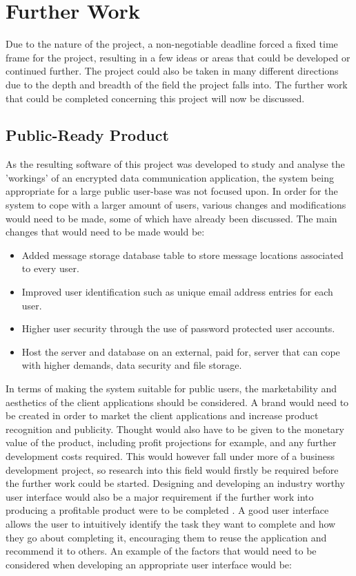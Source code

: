 \documentclass[a4paper,12pt]{report}
\begin{document}
\chapter{Further Work}

Due to the nature of the project, a non-negotiable deadline forced a fixed time frame for the project, resulting in a few ideas or areas that could be developed or continued further. The project could also be taken in many different directions due to the depth and breadth of the field the project falls into. The further work that could be completed concerning this project will now be discussed. 

\section{Public-Ready Product}

As the resulting software of this project was developed to study and analyse the 'workings' of an encrypted data communication application, the system being appropriate for a large public user-base was not focused upon. In order for the system to cope with a larger amount of users, various changes and modifications would need to be made, some of which have already been discussed. The main changes that would need to be made would be:

\begin{itemize}
\item Added message storage database table to store message locations associated to every user.
\item Improved user identification such as unique email address entries for each user. 
\item Higher user security through the use of password protected user accounts. 
\item Host the server and database on an external, paid for, server that can cope with higher demands, data security and file storage.
\end{itemize}

In terms of making the system suitable for public users, the marketability and aesthetics of the client applications should be considered. A brand would need to be created in order to market the client applications and increase product recognition and publicity. Thought would also have to be given to the monetary value of the product, including profit projections for example, and any further development costs required. This would however fall under more of a business development project, so research into this field would firstly be required before the further work could be started. Designing and developing an industry worthy user interface would also be a major requirement if the further work into producing a profitable product were to be completed \cite{interfacebook}. A good user interface allows the user to intuitively identify the task they want to complete and how they go about completing it, encouraging them to reuse the application and recommend it to others. An example of the factors that would need to be considered when developing an appropriate user interface would be:
\end{document}
